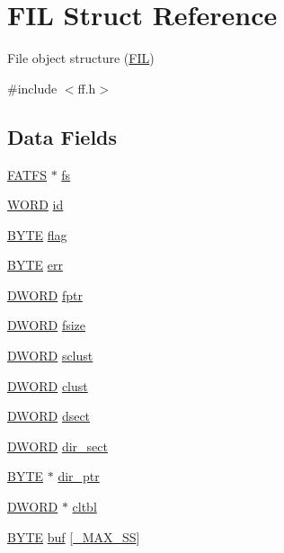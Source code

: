 \hypertarget{structFIL}{}\section{F\+IL Struct Reference}
\label{structFIL}


File object structure (\hyperlink{structFIL}{F\+IL})  




{\ttfamily \#include $<$ff.\+h$>$}

\subsection*{Data Fields}
\begin{DoxyCompactItemize}
\item 
\hyperlink{structFATFS}{F\+A\+T\+FS} $\ast$ \hyperlink{structFIL_a42376a6797a06228911c8b836c1e9030}{fs}
\item 
\hyperlink{integer_8h_a197942eefa7db30960ae396d68339b97}{W\+O\+RD} \hyperlink{structFIL_af7cae0063b0045fb7078b560101ba8f2}{id}
\item 
\hyperlink{integer_8h_a4ae1dab0fb4b072a66584546209e7d58}{B\+Y\+TE} \hyperlink{structFIL_ac409508881f5a16f2998ae675072b376}{flag}
\item 
\hyperlink{integer_8h_a4ae1dab0fb4b072a66584546209e7d58}{B\+Y\+TE} \hyperlink{structFIL_aea440945db26de9c4a88065c0c887fda}{err}
\item 
\hyperlink{integer_8h_ad342ac907eb044443153a22f964bf0af}{D\+W\+O\+RD} \hyperlink{structFIL_a75d29cf9257c827d117887b9f924c4a9}{fptr}
\item 
\hyperlink{integer_8h_ad342ac907eb044443153a22f964bf0af}{D\+W\+O\+RD} \hyperlink{structFIL_aa00790d40d7b0081c345fd4f76e22b70}{fsize}
\item 
\hyperlink{integer_8h_ad342ac907eb044443153a22f964bf0af}{D\+W\+O\+RD} \hyperlink{structFIL_ad308b74c8d6975c6a9c30d90b4124c40}{sclust}
\item 
\hyperlink{integer_8h_ad342ac907eb044443153a22f964bf0af}{D\+W\+O\+RD} \hyperlink{structFIL_aa41312aba551b9a6d1c9d3c8c7d2734b}{clust}
\item 
\hyperlink{integer_8h_ad342ac907eb044443153a22f964bf0af}{D\+W\+O\+RD} \hyperlink{structFIL_ab3d4165d6fd32ac71a130d835fbf0b4d}{dsect}
\item 
\hyperlink{integer_8h_ad342ac907eb044443153a22f964bf0af}{D\+W\+O\+RD} \hyperlink{structFIL_ab203794f939ad4480e81dfa488770783}{dir\+\_\+sect}
\item 
\hyperlink{integer_8h_a4ae1dab0fb4b072a66584546209e7d58}{B\+Y\+TE} $\ast$ \hyperlink{structFIL_a5af9e9fb312b629220eaf684dd28c4a9}{dir\+\_\+ptr}
\item 
\hyperlink{integer_8h_ad342ac907eb044443153a22f964bf0af}{D\+W\+O\+RD} $\ast$ \hyperlink{structFIL_a28a30613d48cefcf9efbd334cd861fc8}{cltbl}
\item 
\hyperlink{integer_8h_a4ae1dab0fb4b072a66584546209e7d58}{B\+Y\+TE} \hyperlink{structFIL_a7a95fb86588663e48309b5cded7e207b}{buf} \mbox{[}\hyperlink{ffconf_8h_ac271b697378912f17132cb9c7d0de024}{\+\_\+\+M\+A\+X\+\_\+\+SS}\mbox{]}
\end{DoxyCompactItemize}


